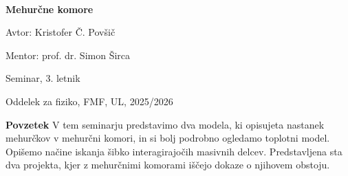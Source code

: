 \documentclass[12pt ]{article}
\begin{document}
 $~$ 
 
 \vspace{2cm}
 
 \centerline{\bf \huge   Mehurčne komore}
 
 \vspace{1cm}
 
  \centerline{\huge  Avtor: Kristofer Č. Povšič}
  
   \vspace{1cm}
  
  \centerline{\large Mentor: prof. dr. Simon Širca}
  
  \vspace{1cm}
  
  \centerline{\large Seminar, 3. letnik}
  
  \vspace{1cm}
  
  \centerline{\large Oddelek za fiziko, FMF, UL, 2025/2026}
  
  \vspace{6cm}
  
  \begin{minipage}[c]{0.9\hsize}
  {\bf Povzetek} V tem seminarju predstavimo dva modela, ki opisujeta nastanek mehurčkov v mehurčni komori, in si bolj podrobno ogledamo toplotni model. Opišemo načine iskanja šibko interagirajočih masivnih delcev. Predstavljena sta dva projekta, kjer z mehurčnimi komorami iščejo dokaze o njihovem obstoju.
    \end{minipage}

 
 \newpage

 \tableofcontents
  
 \newpage

 
 
 
 
 \newpage
 \printbibliography[heading=bibintoc,
 title=Bibliografija]
\end{document}
